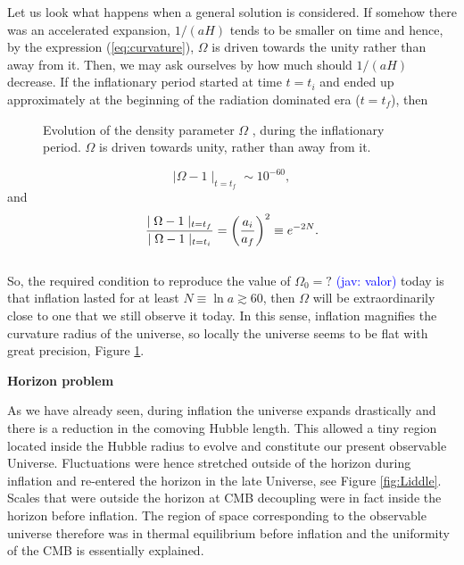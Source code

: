 \documentclass{rmaa}
\def\beq{\begin{equation}}
\def\eeq{\end{equation}}
\newcommand{\jav}[1]{\textcolor{blue}{(jav: #1)}}
\begin{document}
Let us look what happens when a general solution is considered.
If somehow there was an accelerated expansion, $1/(aH)$ tends to be smaller on time and hence,
by the expression (\ref{eq:curvature}), $\Omega$ is driven towards the unity rather than away from it. 
Then, we may ask ourselves by how much should $1/(aH)$ decrease. 
If the inflationary period started at time $t=t_i$ 
and ended up approximately at the beginning of the radiation dominated era ($t=t_f$), then 

\begin{figure}[t!] 
\centerline{ \epsfxsize=200pt  }
\caption{Evolution of the density parameter $\Omega$ , during the inflationary period. $\Omega$ is
driven towards unity, rather than away from it.}%
\label{fig:curvature}
\end{figure}

$$
\mid \Omega -1\mid_{t=t_f}\sim10^{-60},
$$
and
\beq
\frac{\mid \Omega -1\mid_{t=t_f}}{\mid \Omega -1\mid_{t=t_i}}= \left( a_i \over a_f \right)^2\equiv e^{-2N}.
\eeq
\\

So, the required condition to reproduce the value of $\Omega_0=?$ \jav{valor} today is 
that inflation lasted for at least $N\equiv\ln a \gtrsim 60 $, then $\Omega$ will be
extraordinarily close to one that we still observe it today.
In this sense, inflation magnifies the curvature radius of the universe, so 
locally the universe seems to be flat with great precision, Figure \ref{fig:curvature}.



\vskip 16pt
\noindent
\textbf{Horizon problem}
\vskip 6pt


As we have already seen, during inflation the universe expands drastically and there is a 
reduction in the comoving Hubble length. This allowed a tiny region located inside the 
Hubble radius to evolve and constitute our present observable Universe. 
Fluctuations were hence stretched outside of the horizon during inflation and re-entered the horizon 
in the late Universe, see Figure \ref{fig:Liddle}. Scales that were outside the horizon at CMB decoupling 
were in fact inside the horizon before inflation. The region of space corresponding to the 
observable universe therefore was in thermal equilibrium before inflation and the uniformity 
of the CMB is essentially explained.
\\
\end{document}
